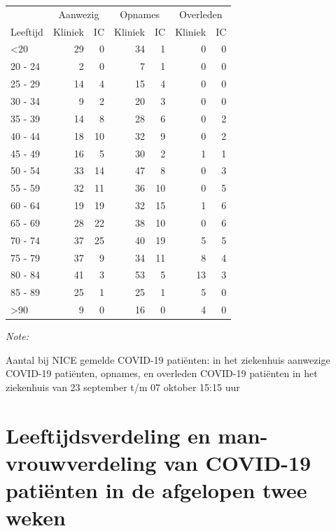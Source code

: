 \documentclass[
  english,
  man,floatsintext]{apa6}
\begin{document}
\begin{table}
\centering\begingroup\fontsize{10}{12}\selectfont

\begin{threeparttable}
\begin{tabular}{lrrrrrr}
\toprule
\multicolumn{1}{c}{ } & \multicolumn{2}{c}{Aanwezig} & \multicolumn{2}{c}{Opnames} & \multicolumn{2}{c}{Overleden} \\
\cmidrule(l{3pt}r{3pt}){2-3} \cmidrule(l{3pt}r{3pt}){4-5} \cmidrule(l{3pt}r{3pt}){6-7}
Leeftijd & Kliniek & IC & Kliniek & IC & Kliniek & IC\\
\midrule
<20 & 29 & 0 & 34 & 1 & 0 & 0\\
20 - 24 & 2 & 0 & 7 & 1 & 0 & 0\\
25 - 29 & 14 & 4 & 15 & 4 & 0 & 0\\
30 - 34 & 9 & 2 & 20 & 3 & 0 & 0\\
35 - 39 & 14 & 8 & 28 & 6 & 0 & 2\\
40 - 44 & 18 & 10 & 32 & 9 & 0 & 2\\
45 - 49 & 16 & 5 & 30 & 2 & 1 & 1\\
50 - 54 & 33 & 14 & 47 & 8 & 0 & 3\\
55 - 59 & 32 & 11 & 36 & 10 & 0 & 5\\
60 - 64 & 19 & 19 & 32 & 15 & 1 & 6\\
65 - 69 & 28 & 22 & 38 & 10 & 0 & 6\\
70 - 74 & 37 & 25 & 40 & 19 & 5 & 5\\
75 - 79 & 37 & 9 & 34 & 11 & 8 & 4\\
80 - 84 & 41 & 3 & 53 & 5 & 13 & 3\\
85 - 89 & 25 & 1 & 25 & 1 & 5 & 0\\
>90 & 9 & 0 & 16 & 0 & 4 & 0\\
\bottomrule
\end{tabular}
\begin{tablenotes}
\item \textit{Note: } 
\item Aantal bij NICE gemelde COVID-19 patiënten: in het ziekenhuis aanwezige COVID-19 patiënten, opnames, en overleden COVID-19 patiënten in het ziekenhuis van 23 september t/m 07 oktober 15:15 uur
\end{tablenotes}
\end{threeparttable}
\endgroup{}
\end{table}

\newpage

\hypertarget{leeftijdsverdeling-en-man-vrouwverdeling-van-covid-19-patiuxebnten-in-de-afgelopen-twee-weken}{%
\section{Leeftijdsverdeling en man-vrouwverdeling van COVID-19 patiënten in de afgelopen twee weken}\label{leeftijdsverdeling-en-man-vrouwverdeling-van-covid-19-patiuxebnten-in-de-afgelopen-twee-weken}}
\end{document}
